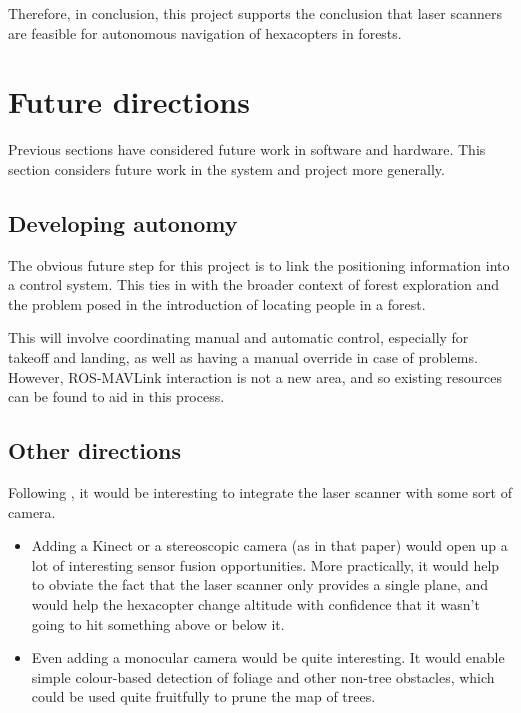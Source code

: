 \documentclass[12pt,oneside,a4paper]{book}
\begin{document}
Therefore, in conclusion, this project supports the conclusion that
laser scanners are feasible for autonomous navigation of hexacopters
in forests.

\section{Future directions}
\label{sec:future-work}

Previous sections have considered future work in software and
hardware. This section considers future work in the system and project
more generally.

\subsection{Developing autonomy}
\label{sec:developing-autonomy}

The obvious future step for this project is to link the positioning
information into a control system. This ties in with the broader
context of forest exploration and the problem posed in the
introduction of locating people in a forest.

This will involve coordinating manual and automatic control,
especially for takeoff and landing, as well as having a manual
override in case of problems. However, ROS-MAVLink interaction is not
a new area, and so existing resources can be found to aid in this process.

\subsection{Other directions}
\label{sec:other-directions}

Following \cite{achtelik2009stereo}, it would be interesting to
integrate the laser scanner with some sort of camera.

\begin{itemize}
\item Adding a Kinect or a stereoscopic
camera (as in that paper) would open up a lot of interesting sensor
fusion opportunities. More practically, it would help to obviate the
fact that the laser scanner only provides a single plane, and would
help the hexacopter change altitude with confidence that it wasn't
going to hit something above or below it.
\item Even adding a monocular camera would be quite interesting. It
  would enable simple colour-based detection of foliage and other
  non-tree obstacles, which could be used quite fruitfully to prune
  the map of trees.
\end{itemize}
\end{document}
